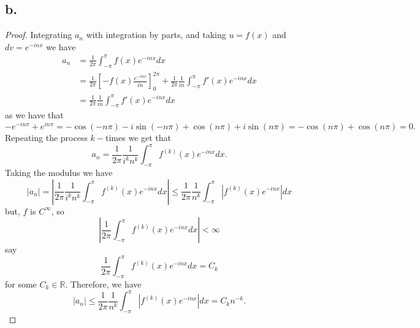 \documentclass{article}
\begin{document}
\subsection*{b.}
\begin{proof}
    Integrating $a_n$ with integration by parts, and taking $u = f(x)$ and $dv = e^{-inx}$ we have 
    \begin{align*}
        a_n &= \frac{1}{2 \pi} \int_{-\pi}^{\pi} f(x) e^{-inx} dx \\
        &= \frac{1}{2 \pi}\left[-f(x)\frac{e^{-inx}}{in}\right]_0^{2 \pi} + \frac{1}{2 \pi}\frac{1}{in}\int_{-\pi}^{\pi}f'(x)e^{-inx}dx\\
        &= \frac{1}{2 \pi}\frac{1}{in}\int_{-\pi}^{\pi}f'(x)e^{-inx}dx
    \end{align*}
    as we have that 
    \[
    -e^{-in\pi} + e^{in \pi} = -\cos(-n \pi ) -i\sin(-n\pi) + \cos(n\pi) +  i\sin(n \pi) = -\cos(n \pi) + \cos(n \pi) = 0.   
    \]
    Repeating the process $k-$times we get that 
    \[
    a_n =  \frac{1}{2 \pi}\frac{1}{i^kn^k}\int_{-\pi}^{\pi}f^{(k)}(x)e^{-inx}dx.   
    \]
    Taking the modulus we have
    \[
    |a_n| = \left| \frac{1}{2 \pi}\frac{1}{i^kn^k}\int_{-\pi}^{\pi}f^{(k)}(x)e^{-inx}dx \right| \leq  \frac{1}{2 \pi}\frac{1}{n^k}\int_{-\pi}^{\pi}\left|f^{(k)}(x)e^{-inx}\right|dx
    \]
    but, $f$ is $C^{\infty}$, so 
    \[
        \left|\frac{1}{2 \pi}\int_{-\pi}^{\pi}f^{(k)}(x)e^{-inx}dx\right| < \infty
    \]
    say \[
        \frac{1}{2 \pi}\int_{-\pi}^{\pi}f^{(k)}(x)e^{-inx}dx = C_k    
    \]
    for some $C_k \in \mathbb{R}$. Therefore, we have 
    \[
    |a_n| \leq  \frac{1}{2 \pi}\frac{1}{n^k}\int_{-\pi}^{\pi}\left|f^{(k)}(x)e^{-inx}\right|dx = C_kn^{-k}.    
    \]
\end{proof}
\end{document}
